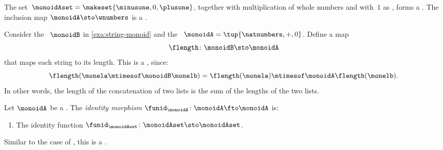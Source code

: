 
\begin{example}
    The set~$\monoidAset = \makeset{ \minusone, 0, \plusone }$, together with multiplication of whole numbers and with~$1$ as , forms a .
    The inclusion map $\monoidA \sto \wnumbers$ is a .
\end{example}

\begin{example}
    \label{exa:string-length}
    Consider the ~$\monoidB$ in \cref{exa:string-monoid} and the ~$\monoidA=\tup{\natnumbers, +, 0}$.
    Define a map
    \begin{equation}
        \flength \colon \monoidB \sto \monoidA
    \end{equation}
    that maps each string to its length.
    This is a , since:
    \begin{equation}
        \flength(\monela \mtimesof\monoidB \monelb)=\flength(\monela)\mtimesof\monoidA \flength(\monelb).
    \end{equation}
    In other words, the length of the concatenation of two lists is the sum of the lengths of the two lists.
\end{example}

\begin{ctdefinition}
    \label{def:identity-mon-mor}
    Let $\monoidA$ be a .
    The \emph{identity morphism} $\funid_\monoidA\colon \monoidA \fto \monoidA$ is:

    \constit
    \begin{enumerate}
        \item The identity function $\funid_\monoidAset \colon \monoidAset \sto \monoidAset$.
    \end{enumerate}
    Similar to the case of , this is a .
\end{ctdefinition}

